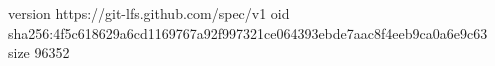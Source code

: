 version https://git-lfs.github.com/spec/v1
oid sha256:4f5c618629a6cd1169767a92f997321ce064393ebde7aac8f4eeb9ca0a6e9c63
size 96352
